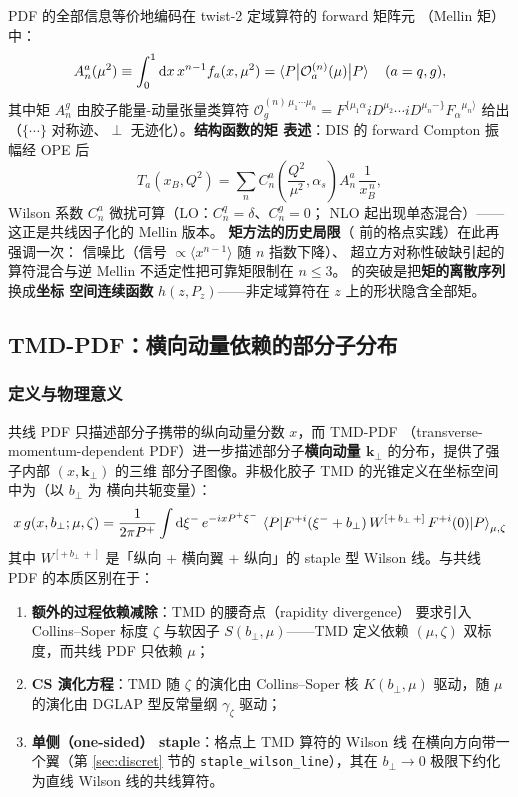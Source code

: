 \documentclass[11pt,a4paper]{ctexart}
\newcommand{\LaMET}{\text{LaMET}}
\newcommand{\code}[1]{\texttt{#1}}
\newcommand{\bperp}{b_{\perp}}
\begin{document}
PDF 的全部信息等价地编码在 twist-2 定域算符的 forward 矩阵元
（Mellin 矩）中：
\begin{equation}
A^{a}_n(\mu^2) \equiv
\int_0^1 \mathrm{d}x\,x^{n-1}f_a(x,\mu^2)
= \braket{P\big|\mathcal O^{(n)}_a(\mu)\big|P}
\quad(a=q,g),
\end{equation}
其中矩 $A^g_n$ 由胶子能量-动量张量类算符
$\mathcal O_g^{(n)\,\mu_1\cdots\mu_n}
=F^{\{\mu_1\alpha}iD^{\mu_2}\cdots iD^{\mu_n-\}}F_\alpha{}^{\mu_n\rangle}$
给出（$\{\cdots\}$ 对称迹、$\perp$ 无迹化）。\textbf{结构函数的矩
表述}：DIS 的 forward Compton 振幅经 OPE 后
\begin{equation}
T_a(x_B,Q^2) = \sum_n C^a_n\!\left(\frac{Q^2}{\mu^2},\alpha_s\right)
A^a_n\,\frac{1}{x_B^{\,n}},
\end{equation}
Wilson 系数 $C^a_n$ 微扰可算（LO：$C^q_n=\delta$、$C^g_n=0$；
NLO 起出现单态混合）——这正是共线因子化的 Mellin 版本。
\textbf{矩方法的历史局限}（\LaMET{} 前的格点实践）在此再强调一次：
信噪比（信号 $\propto\langle x^{n-1}\rangle$ 随 $n$ 指数下降）、
超立方对称性破缺引起的算符混合与逆 Mellin 不适定性把可靠矩限制在
$n\le3$。\LaMET{} 的突破是把\textbf{矩的离散序列}换成\textbf{坐标
空间连续函数} $h(z,P_z)$——非定域算符在 $z$ 上的形状隐含全部矩。

\subsection{TMD-PDF：横向动量依赖的部分子分布}

\subsubsection{定义与物理意义}

共线 PDF 只描述部分子携带的纵向动量分数 $x$，而 TMD-PDF
（transverse-momentum-dependent PDF）进一步描述部分子\textbf{横向动量
$\mathbf{k}_\perp$} 的分布，提供了强子内部 $(x, \mathbf{k}_\perp)$ 的三维
部分子图像。非极化胶子 TMD 的光锥定义在坐标空间中为（以 $b_\perp$ 为
横向共轭变量）：
\begin{equation}\label{eq:tmd-def}
x\,g(x,\bperp;\mu,\zeta) = \frac{1}{2\pi P^+} \int \mathrm{d}\xi^{-}\,
e^{-ixP^+\xi^{-}}\,
\braket{P|F^{+i}(\xi^- + b_\perp)\, W^{[+\,b_\perp\,+]}\,
F^{+i}(0)|P}_{\mu,\zeta}
\end{equation}
其中 $W^{[+\,b_\perp\,+]}$ 是「纵向 + 横向翼 + 纵向」的 staple 型 Wilson
线。与共线 PDF 的本质区别在于：

\begin{enumerate}
  \item \textbf{额外的过程依赖减除}：TMD 的腰奇点（rapidity divergence）
  要求引入 Collins--Soper 标度 $\zeta$ 与软因子 $S(b_\perp,\mu)$——TMD
  定义依赖 $(\mu,\zeta)$ 双标度，而共线 PDF 只依赖 $\mu$；
  \item \textbf{CS 演化方程}：TMD 随 $\zeta$ 的演化由 Collins--Soper 核
  $K(b_\perp,\mu)$ 驱动，随 $\mu$ 的演化由 DGLAP 型反常量纲 $\gamma_\zeta$
  驱动；
  \item \textbf{单侧（one-sided） staple}：格点上 TMD 算符的 Wilson 线
  在横向方向带一个翼（第 \ref{sec:discret} 节的
  \code{staple\_wilson\_line}），其在 $b_\perp\to0$ 极限下约化为直线
  Wilson 线的共线算符。
\end{enumerate}
\end{document}
